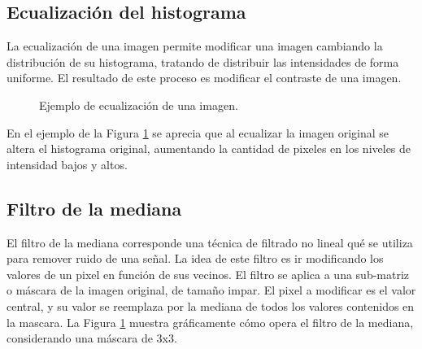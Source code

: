 \documentclass[
  letterpaper,
  twocolumn,
  9pt,
  journal,
  final]{IEEEtran}
\begin{document}
\subsection{Ecualización del histograma}

La ecualización de una imagen permite modificar una imagen cambiando la distribución de su histograma, tratando de distribuir las intensidades de forma uniforme. El resultado de este proceso es modificar el contraste de una imagen.

\begin{figure}[!tbh]
  \begin{center}
  \end{center}
  \caption{Ejemplo de ecualización de una imagen\cite{carrasco1}.} \label{fig:sample_eq}
\end{figure}

En el ejemplo de la Figura \ref{fig:sample_eq} se aprecia que al ecualizar la imagen original se altera el histograma original, aumentando la cantidad de pixeles en los niveles de intensidad bajos y altos.

\subsection{Filtro de la mediana}

El filtro de la mediana corresponde una técnica de filtrado no lineal qué se utiliza para remover ruido de una señal. La idea de este filtro es ir modificando los valores de un pixel en función de sus vecinos. El filtro se aplica a una sub-matriz o máscara de la imagen original, de tamaño impar. El pixel a modificar es el valor central, y su valor se reemplaza por la mediana de todos los valores contenidos en la mascara. La Figura \ref{fig:sample_eq} muestra gráficamente cómo opera el filtro de la mediana, considerando una máscara de 3x3.
\end{document}
